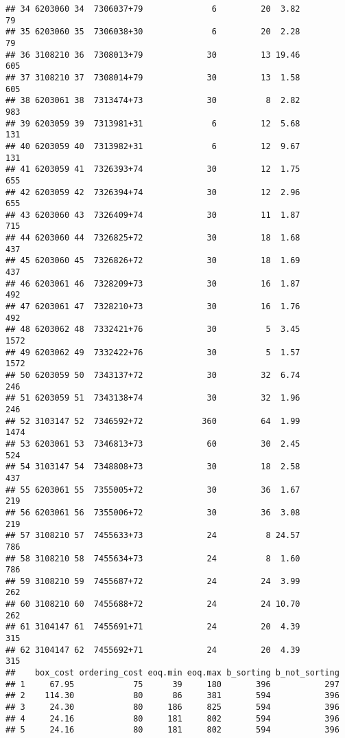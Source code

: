 \documentclass[
]{article}
\begin{document}
\begin{verbatim}
## 34 6203060 34  7306037+79              6         20  3.82              79
## 35 6203060 35  7306038+30              6         20  2.28              79
## 36 3108210 36  7308013+79             30         13 19.46             605
## 37 3108210 37  7308014+79             30         13  1.58             605
## 38 6203061 38  7313474+73             30          8  2.82             983
## 39 6203059 39  7313981+31              6         12  5.68             131
## 40 6203059 40  7313982+31              6         12  9.67             131
## 41 6203059 41  7326393+74             30         12  1.75             655
## 42 6203059 42  7326394+74             30         12  2.96             655
## 43 6203060 43  7326409+74             30         11  1.87             715
## 44 6203060 44  7326825+72             30         18  1.68             437
## 45 6203060 45  7326826+72             30         18  1.69             437
## 46 6203061 46  7328209+73             30         16  1.87             492
## 47 6203061 47  7328210+73             30         16  1.76             492
## 48 6203062 48  7332421+76             30          5  3.45            1572
## 49 6203062 49  7332422+76             30          5  1.57            1572
## 50 6203059 50  7343137+72             30         32  6.74             246
## 51 6203059 51  7343138+74             30         32  1.96             246
## 52 3103147 52  7346592+72            360         64  1.99            1474
## 53 6203061 53  7346813+73             60         30  2.45             524
## 54 3103147 54  7348808+73             30         18  2.58             437
## 55 6203061 55  7355005+72             30         36  1.67             219
## 56 6203061 56  7355006+72             30         36  3.08             219
## 57 3108210 57  7455633+73             24          8 24.57             786
## 58 3108210 58  7455634+73             24          8  1.60             786
## 59 3108210 59  7455687+72             24         24  3.99             262
## 60 3108210 60  7455688+72             24         24 10.70             262
## 61 3104147 61  7455691+71             24         20  4.39             315
## 62 3104147 62  7455692+71             24         20  4.39             315
##    box_cost ordering_cost eoq.min eoq.max b_sorting b_not_sorting
## 1     67.95            75      39     180       396           297
## 2    114.30            80      86     381       594           396
## 3     24.30            80     186     825       594           396
## 4     24.16            80     181     802       594           396
## 5     24.16            80     181     802       594           396

\end{verbatim}
\end{document}
